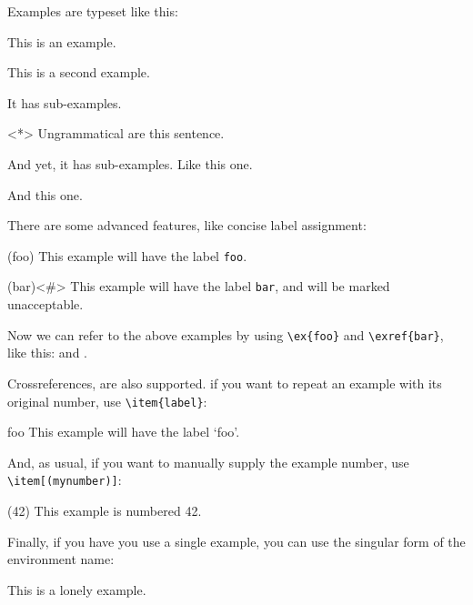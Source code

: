\documentclass{article}
\begin{document}
%
\noindent Examples are typeset like this:
    \begin{examples}
        \item This is an example.
        \item This is a second example.
              \begin{examples}
                  \item It has sub-examples.
                  \item<*> Ungrammatical are this sentence.
                        \begin{examples}
                            \item And yet, it has sub-examples. Like this one.
                            \item And this one.
                        \end{examples}
              \end{examples}
    \end{examples}
There are some advanced features, like concise label assignment:
\begin{examples}
    \item(foo) This example will have the label \verb|foo|.
    \item(bar)<\#> This example will have the label \verb|bar|, and will be marked 
                unacceptable.
\end{examples}
%
Now we can refer to the above examples by using \verb|\ex{foo}| and \verb|\exref{bar}|, like this:  and .

Crossreferences, are also supported. if you want to repeat an example with its original 
number, use \verb|\item{label}|:
\begin{examples}
    \item{foo} This example will have the label `foo'.
\end{examples}
%
And, as usual, if you want to manually supply the example number, use \verb|\item[(mynumber)]|:
\begin{examples}
    \item[(42)] This example is numbered 42.
\end{examples}
%
Finally, if you have you use a single example, you can use the singular form of the environment name:
\begin{example}
    \item This is a lonely example.
\end{example}
\end{document}
